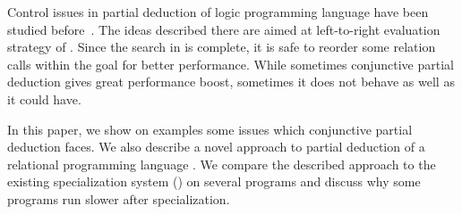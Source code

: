 Control issues in partial deduction of logic programming language \pro have been studied before~\cite{leuschel2002logic}.
The ideas described there are aimed at left-to-right evaluation strategy of \pro.
Since the search in \mk is complete, it is safe to reorder some relation calls within the goal for better performance.
While sometimes conjunctive partial deduction gives great performance boost, sometimes it does not behave as well as it could have.

In this paper, we show on examples some issues which conjunctive partial deduction faces.
We also describe a novel approach to partial deduction of a relational programming language \mk.
We compare the described approach to the existing specialization system (\ecce) on several programs and discuss why some \mk programs run slower after specialization.
